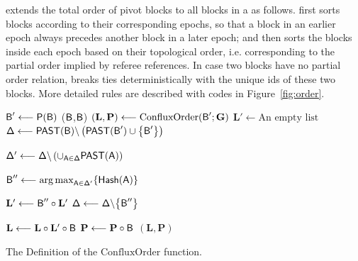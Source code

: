 {\name} extends the total order of pivot blocks to all blocks in a \tg as follows.
{\name} first sorts blocks according to their corresponding epochs, so that a block in an earlier epoch always precedes another block in a later epoch;
and then {\name} sorts the blocks inside each epoch based on their topological order, i.e. corresponding to the partial order implied by referee references.
In case two blocks have no partial order relation, {\name} breaks ties deterministically with the unique ids of these two blocks. 
{More detailed rules are described with codes in Figure~\ref{fig:order}.}

\begin{algorithm}[!htb]
	\small
	\SetNlSty{}{}{}
	\DontPrintSemicolon
	\let\oldnl\nl%
	\newcommand{\nonl}{\renewcommand{\nl}{\let\nl\oldnl}}%
	
	$\textsf{B}' \longleftarrow \mathsf{P}(\textsf{B})$\;
	 {
		\Return ($\textsf{B}$,$\textsf{B}$)\;
	}
	$(\mathbf{L},\mathbf{P}) \longleftarrow \mathrm{ConfluxOrder}( \textsf{B}';\textbf{G})$\;
	$\mathbf{L}' \longleftarrow \text{An empty list}$\;
	$\mathsf{\Delta} \longleftarrow \mathsf{PAST}(\textsf{B}) \backslash \left(\mathsf{PAST}(\textsf{B}') \cup {\left \{{\textsf{B}'} \right \}}\right)$\;
	\While {$\mathsf{\Delta} \neq \varnothing$} {
		$\mathsf{\Delta}' \longleftarrow \mathsf{\Delta} \backslash\left(\cup_{\textsf{A} \in \mathsf{\Delta}} \mathsf{PAST}(\textsf{A}) \right)$\;

		
		$\textsf{B}''\longleftarrow {\arg\max}_{\textsf{A}\in\mathsf{\Delta'}}{\left \{{\mathsf{Hash}(\textsf{A})} \right \}}$\;

		$\mathbf{L}' \longleftarrow \textsf{B}'' \circ \mathbf{L}'$ \;
		$\mathsf{\Delta} \longleftarrow \mathsf{\Delta} \backslash {\left \{{\textsf{B}''} \right \}}$\;
	}
	$\mathbf{L}  \longleftarrow \mathbf{L} \circ \mathbf{L}' \circ \textsf{B}$\;
	$\mathbf{P} \longleftarrow  \mathbf{P}\circ \textsf{B}$\;
	\Return $(\mathbf{L},\mathbf{P})$\;
	\caption{The Definition of the $\mathrm{ConfluxOrder}$ function.}
	\label{fig:order}
\end{algorithm}


